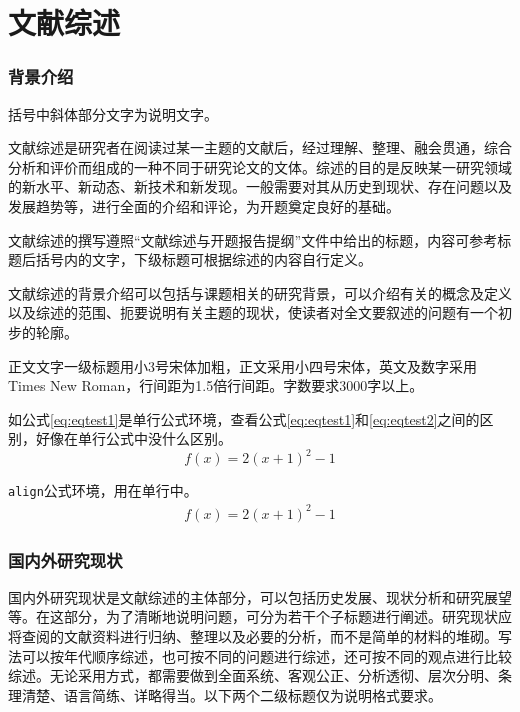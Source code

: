 \part{文献综述} %
\label{prt:文献综述_}
	\setcounter{section}{0}
	\section{背景介绍} %
	\label{sec:背景介绍}
		括号中斜体部分文字为说明文字。

		文献综述是研究者在阅读过某一主题的文献后，经过理解、整理、融会贯通，综合分析和评价而组成的一种不同于研究论文的文体。综述的目的是反映某一研究领域的新水平、新动态、新技术和新发现。一般需要对其从历史到现状、存在问题以及发展趋势等，进行全面的介绍和评论，为开题奠定良好的基础。

		文献综述的撰写遵照“文献综述与开题报告提纲”文件中给出的标题，内容可参考标题后括号内的文字，下级标题可根据综述的内容自行定义。

		文献综述的背景介绍可以包括与课题相关的研究背景，可以介绍有关的概念及定义以及综述的范围、扼要说明有关主题的现状，使读者对全文要叙述的问题有一个初步的轮廓。

		正文文字一级标题用小3号宋体加粗，正文采用小四号宋体，英文及数字采用Times New Roman，行间距为1.5倍行间距。字数要求3000字以上。

		如公式\eqref{eq:eqtest1}是单行公式环境，查看公式\eqref{eq:eqtest1}和\eqref{eq:eqtest2}之间的区别，好像在单行公式中没什么区别。
		\begin{equation}
		\label{eq:eqtest1}
			f(x) = 2(x + 1)^{2} - 1
		\end{equation}

		\texttt{align}公式环境，用在单行中。
		\begin{align}
		\label{eq:eqtest2}
			f(x) = 2(x + 1)^{2} - 1
		\end{align}
	\newpage
	\section{国内外研究现状} %
	\label{sec:国内外研究现状}
		国内外研究现状是文献综述的主体部分，可以包括历史发展、现状分析和研究展望等。在这部分，为了清晰地说明问题，可分为若干个子标题进行阐述。研究现状应将查阅的文献资料进行归纳、整理以及必要的分析，而不是简单的材料的堆砌。写法可以按年代顺序综述，也可按不同的问题进行综述，还可按不同的观点进行比较综述。无论采用方式，都需要做到全面系统、客观公正、分析透彻、层次分明、条理清楚、语言简练、详略得当。以下两个二级标题仅为说明格式要求。

